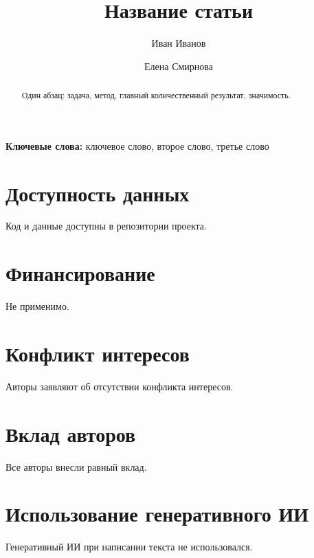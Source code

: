 \documentclass[11pt]{article}
\title{Название статьи}
\author[1]{Иван Иванов}
\author[1]{Елена Смирнова}
\affil[1]{Лаборатория стохастической оптимизации, Университет-Пример}
\newcommand{\keywords}[1]{\par\noindent\textbf{Ключевые слова:} #1}
\begin{document}
\maketitle

\begin{abstract}
Один абзац: задача, метод, главный количественный результат, значимость.
\end{abstract}
\keywords{ключевое слово, второе слово, третье слово}







\section*{Доступность данных}
Код и данные доступны в репозитории проекта.

\section*{Финансирование}
Не применимо.

\section*{Конфликт интересов}
Авторы заявляют об отсутствии конфликта интересов.

\section*{Вклад авторов}
Все авторы внесли равный вклад.

\section*{Использование генеративного ИИ}
Генеративный ИИ при написании текста не использовался.



\end{document}
